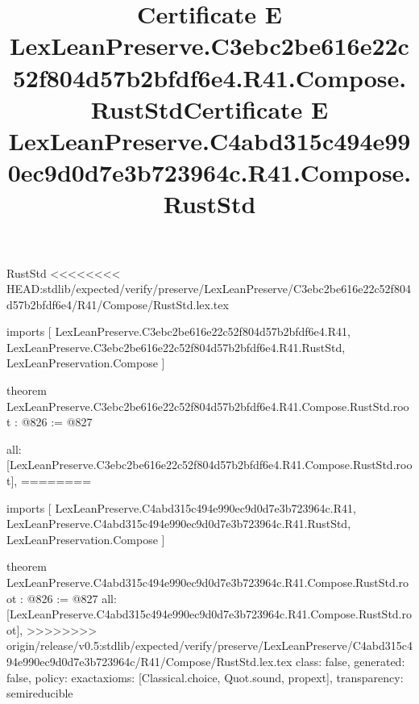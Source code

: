 \begin{lexlean}{RustStd}
<<<<<<<< HEAD:stdlib/expected/verify/preserve/LexLeanPreserve/C3ebc2be616e22c52f804d57b2bfdf6e4/R41/Compose/RustStd.lex.tex
\title{Certificate E LexLeanPreserve.C3ebc2be616e22c52f804d57b2bfdf6e4.R41.Compose.RustStd}
\begin{coremodule}
imports [
  LexLeanPreserve.C3ebc2be616e22c52f804d57b2bfdf6e4.R41,
  LexLeanPreserve.C3ebc2be616e22c52f804d57b2bfdf6e4.R41.RustStd,
  LexLeanPreservation.Compose
]

theorem LexLeanPreserve.C3ebc2be616e22c52f804d57b2bfdf6e4.R41.Compose.RustStd.root : @826 := @827 {
  all: [LexLeanPreserve.C3ebc2be616e22c52f804d57b2bfdf6e4.R41.Compose.RustStd.root],
========
\title{Certificate E LexLeanPreserve.C4abd315c494e990ec9d0d7e3b723964c.R41.Compose.RustStd}
\begin{coremodule}
imports [
  LexLeanPreserve.C4abd315c494e990ec9d0d7e3b723964c.R41,
  LexLeanPreserve.C4abd315c494e990ec9d0d7e3b723964c.R41.RustStd,
  LexLeanPreservation.Compose
]

theorem LexLeanPreserve.C4abd315c494e990ec9d0d7e3b723964c.R41.Compose.RustStd.root : @826 := @827 {
  all: [LexLeanPreserve.C4abd315c494e990ec9d0d7e3b723964c.R41.Compose.RustStd.root],
>>>>>>>> origin/release/v0.5:stdlib/expected/verify/preserve/LexLeanPreserve/C4abd315c494e990ec9d0d7e3b723964c/R41/Compose/RustStd.lex.tex
  class: false,
  generated: false,
  policy: exact{axioms: [Classical.choice, Quot.sound, propext]},
  transparency: semireducible
}


\end{coremodule}}
\end{coremodule}
\end{lexlean}
